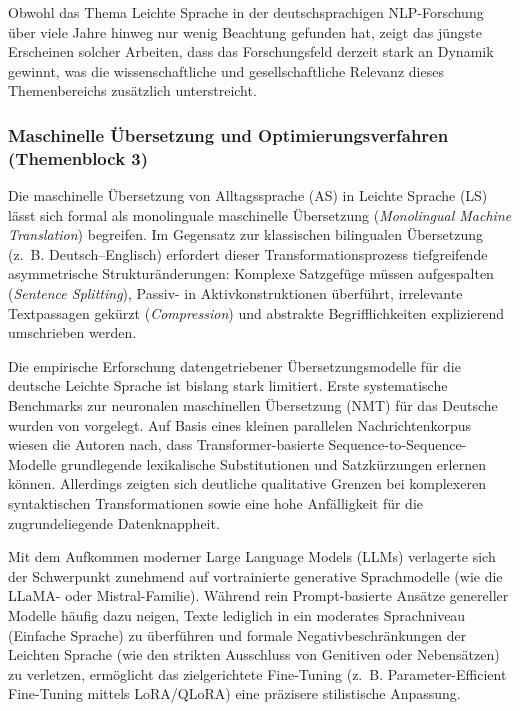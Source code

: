 Obwohl das Thema Leichte Sprache in der deutschsprachigen NLP-Forschung über viele Jahre hinweg nur wenig Beachtung gefunden hat, zeigt das jüngste Erscheinen solcher Arbeiten, dass das Forschungsfeld derzeit stark an Dynamik gewinnt, was die wissenschaftliche und gesellschaftliche Relevanz dieses Themenbereichs zusätzlich unterstreicht.

\subsubsection{Maschinelle Übersetzung und Optimierungsverfahren (Themenblock 3)}
\label{sec:maschinelle_textvereinfachung_alignment}
\label{sec:maschinelle_uebersetzung_modellierung}
\label{sec:dpo_textgenerierung}

Die maschinelle Übersetzung von Alltagssprache (AS) in Leichte Sprache (LS) lässt sich formal als monolinguale maschinelle Übersetzung (\textit{Monolingual Machine Translation}) begreifen. Im Gegensatz zur klassischen bilingualen Übersetzung (z.~B. Deutsch--Englisch) erfordert dieser Transformationsprozess tiefgreifende asymmetrische Strukturänderungen: Komplexe Satzgefüge müssen aufgespalten (\textit{Sentence Splitting}), Passiv- in Aktivkonstruktionen überführt, irrelevante Textpassagen gekürzt (\textit{Compression}) und abstrakte Begrifflichkeiten explizierend umschrieben werden.

Die empirische Erforschung datengetriebener Übersetzungsmodelle für die deutsche Leichte Sprache ist bislang stark limitiert. Erste systematische Benchmarks zur neuronalen maschinellen Übersetzung (NMT) für das Deutsche wurden von \citet{saeuberli2020benchmarking} vorgelegt. Auf Basis eines kleinen parallelen Nachrichtenkorpus wiesen die Autoren nach, dass Transformer-basierte Sequence-to-Sequence-Modelle grundlegende lexikalische Substitutionen und Satzkürzungen erlernen können. Allerdings zeigten sich deutliche qualitative Grenzen bei komplexeren syntaktischen Transformationen sowie eine hohe Anfälligkeit für die zugrundeliegende Datenknappheit.

Mit dem Aufkommen moderner Large Language Models (LLMs) verlagerte sich der Schwerpunkt zunehmend auf vortrainierte generative Sprachmodelle (wie die LLaMA- oder Mistral-Familie). Während rein Prompt-basierte Ansätze genereller Modelle häufig dazu neigen, Texte lediglich in ein moderates Sprachniveau (Einfache Sprache) zu überführen und formale Negativbeschränkungen der Leichten Sprache (wie den strikten Ausschluss von Genitiven oder Nebensätzen) zu verletzen, ermöglicht das zielgerichtete Fine-Tuning (z.~B. Parameter-Efficient Fine-Tuning mittels LoRA/QLoRA) eine präzisere stilistische Anpassung.

